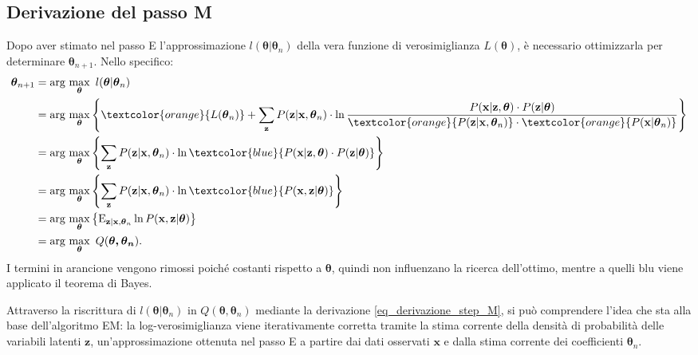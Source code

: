 \subsection{Derivazione del passo M}
Dopo aver stimato nel passo E l'approssimazione $l(\boldsymbol{\theta}|\boldsymbol{\theta}_n)$  della vera funzione di verosimiglianza $L(\boldsymbol{\theta})$, è necessario ottimizzarla per determinare $\boldsymbol{\theta}_{n+1}$. Nello specifico:
\begin{equation}
	\begin{split}
		\boldsymbol{\theta}_{n+1} & = \text{arg}\,\max\limits_{\boldsymbol{\theta}}\  l(\boldsymbol{\theta}|\boldsymbol{\theta}_n) \\
		& =  \text{arg}\,\max\limits_{\boldsymbol{\theta}}\left\{ \textcolor{orange}{L(\boldsymbol{\theta}_n)} + \sum_{\mathbf{z}}^{} P(\mathbf{z}|\mathbf{x},\boldsymbol{\theta}_n)\cdot\ln\frac{P(\mathbf{x}|\mathbf{z},\boldsymbol{\theta})\cdot P(\mathbf{z}|\boldsymbol{\theta})}{\textcolor{orange}{P(\mathbf{z}|\mathbf{x},\boldsymbol{\theta}_n)}\cdot\textcolor{orange}{P(\mathbf{x}|\boldsymbol{\theta}_n)}}\right\} \\
		& = \text{arg}\,\max\limits_{\boldsymbol{\theta}}\left\{\sum_{\mathbf{z}}^{} P(\mathbf{z}|\mathbf{x},\boldsymbol{\theta}_n)\cdot\ln\textcolor{blue}{ P(\mathbf{x}|\mathbf{z},\boldsymbol{\theta})\cdot P(\mathbf{z}|\boldsymbol{\theta})}\right\}\\
		& = \text{arg}\,\max\limits_{\boldsymbol{\theta}}\left\{\sum_{\mathbf{z}}^{}P(\mathbf{z}|\mathbf{x},\boldsymbol{\theta}_n)\cdot\ln \textcolor{blue}{P(\mathbf{x},\mathbf{z}|\boldsymbol{\theta})}\right\}\\
		& = \text{arg}\,\max\limits_{\boldsymbol{\theta}}\left\{\text{E}_{\mathbf{z}|\mathbf{x},\boldsymbol{\theta}_n}\ln P(\mathbf{x},\mathbf{z}|\boldsymbol{\theta})\right\}\\
		& = \text{arg}\,\max\limits_{\boldsymbol{\theta}}\ Q(\boldsymbol{\theta,\boldsymbol{\theta}_n}).
	\end{split}
\label{eq_derivazione_step_M}
\end{equation}
I termini in arancione vengono rimossi poiché costanti rispetto a $\boldsymbol{\theta}$, quindi non influenzano la ricerca dell'ottimo, mentre a quelli blu viene applicato il teorema di Bayes. \par Attraverso la riscrittura di $l(\boldsymbol{\theta}|\boldsymbol{\theta}_n)$ in $Q(\boldsymbol{\theta},\boldsymbol{\theta}_n)$ mediante la derivazione \ref{eq_derivazione_step_M}, si può comprendere l'idea che sta alla base dell'algoritmo EM: la log-verosimiglianza viene iterativamente corretta tramite la stima corrente della densità di probabilità delle variabili latenti $\mathbf{z}$, un'approssimazione ottenuta nel passo E a partire dai dati osservati $\mathbf{x}$ e dalla stima corrente dei coefficienti $\boldsymbol{\theta}_n$.
